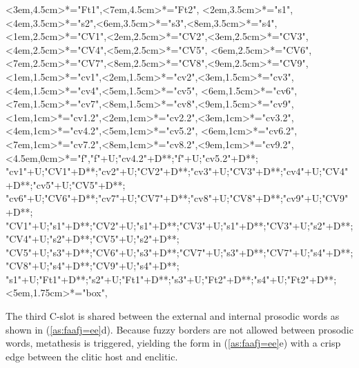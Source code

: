\begin{multicols}{2}
\begin{exe}
{\begin{xlist}
{		<3em,4.5cm>*="Ft1",<7em,4.5cm>*="Ft2",
		<2em,3.5cm>*="s1",<4em,3.5cm>*="s2",<6em,3.5cm>*="s3",<8em,3.5cm>*="s4",
		<1em,2.5cm>*="CV1",<2em,2.5cm>*="CV2",<3em,2.5cm>*="CV3",<4em,2.5cm>*="CV4",<5em,2.5cm>*="CV5",
		<6em,2.5cm>*="CV6",<7em,2.5cm>*="CV7",<8em,2.5cm>*="CV8",<9em,2.5cm>*="CV9",
		<1em,1.5cm>*="cv1",<2em,1.5cm>*="cv2",<3em,1.5cm>*="cv3",<4em,1.5cm>*="cv4",<5em,1.5cm>*\as{\j}="cv5",
		<6em,1.5cm>*="cv6",<7em,1.5cm>*\as{ }="cv7",<8em,1.5cm>*="cv8",<9em,1.5cm>*\as{ }="cv9",
		<1em,1cm>*="cv1.2",<2em,1cm>*="cv2.2",<3em,1cm>*="cv3.2",<4em,1cm>*="cv4.2",<5em,1cm>*\as{\j}="cv5.2",
		<6em,1cm>*="cv6.2",<7em,1cm>*\as{ }="cv7.2",<8em,1cm>*="cv8.2",<9em,1cm>*\as{ }="cv9.2",
		<4.5em,0cm>*\as{\tsc{[+fr.]}}="f","f"+U;"cv4.2"+D**\dir{-};"f"+U;"cv5.2"+D**\dir{-};
		"cv1"+U;"CV1"+D**\dir{-};"cv2"+U;"CV2"+D**\dir{-};"cv3"+U;"CV3"+D**\dir{-};"cv4"+U;"CV4"+D**\dir{-};"cv5"+U;"CV5"+D**\dir{-};
		"cv6"+U;"CV6"+D**\dir{-};"cv7"+U;"CV7"+D**\dir{};"cv8"+U;"CV8"+D**\dir{-};"cv9"+U;"CV9"+D**\dir{};
		"CV1"+U;"s1"+D**\dir{-};"CV2"+U;"s1"+D**\dir{-};"CV3"+U;"s1"+D**\dir{-};"CV3"+U;"s2"+D**\dir{-};"CV4"+U;"s2"+D**\dir{-};"CV5"+U;"s2"+D**\dir{-};
		"CV5"+U;"s3"+D**\dir{-};"CV6"+U;"s3"+D**\dir{-};"CV7"+U;"s3"+D**\dir{-};"CV7"+U;"s4"+D**\dir{-};"CV8"+U;"s4"+D**\dir{-};"CV9"+U;"s4"+D**\dir{-};
		"s1"+U;"Ft1"+D**\dir{-};"s2"+U;"Ft1"+D**\dir{-};"s3"+U;"Ft2"+D**\dir{-};"s4"+U;"Ft2"+D**\dir{-};
		<5em,1.75cm>*="box",
	\endxy}\label{as:faafj=ee2}
	\end{xlist}}
\end{exe}
\end{multicols}

The third C-slot is shared between the external and internal prosodic
words as shown in (\ref{as:faafj=ee}d).
Because fuzzy borders are not allowed between prosodic words,
metathesis is triggered, yielding the form in (\ref{as:faafj=ee}e) with
a crisp edge between the clitic host and enclitic.

